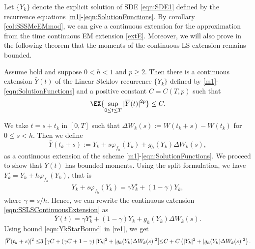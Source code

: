 	
Let $\{Y_k\}$ denote the explicit \SM solution of SDE \eqref{eqn:SDE1} defined by 
the recurrence equations \eqref{m1}-\eqref{eqn:SolutionFunctions}.
By corollary \ref{col:SSSMeEMmod}, we can give a continuous extension for the \SM approximation 
from the time continuous EM extension  \eqref{extE}. 
Moreover, we will also prove in the following theorem that the  moments 
of the continuous LS extension remains bounded.
\begin{corollary}\label{col:ContinuousExtBoundedMoments}
	Assume  hold and suppose  $0<h<1$ and $p\geq 
	2$. Then there is a continuous extension $\overline{Y}(t)$ of the 
	Linear Steklov recurrence $\{Y_k\}$ defined by  
	\eqref{m1}-\eqref{eqn:SolutionFunctions}  and a positive constant $C=C(T,p)$ such 
	that
	\begin{equation*}
		\EX{\sup_{0\leq t \leq T} |\overline{Y}(t)|^{2p} }
		\leq C.
	\end{equation*}
\end{corollary}
	\begin{pf}
		We take $t=s+t_k$ in $ [0,T]$ such that $\Delta W_k(s):= W(t_k+s)- W(t_k)$ for $0\leq s <h$.
		Then we define 
		\begin{equation}\label{eqn:SSLSContinuousExtension}
			\overline{Y}(t_k+s):= Y_k + s \varphi_{f_h}(Y_k) + g_h(Y_k)\Delta W_k(s),
		\end{equation}
		as a continuous extension of the \SM scheme \eqref{m1}-\eqref{eqn:SolutionFunctions}. 
		We proceed to show that $\overline{Y}(t)$ has bounded moments.
		Using the split formulation, we have $Y_k^{\star}= Y_k + h \varphi_{f_h}(Y_k)$,
		that is
		\begin{align*}
			Y_k + s \varphi_{f_h}(Y_k)=\gamma Y_k^{\star} + (1-\gamma)Y_k,
		\end{align*}
		where $\gamma = s/h$. Hence, we can rewrite the continuous extension \eqref{eqn:SSLSContinuousExtension} as
		\begin{equation}\label{re1}
			\overline{Y}(t) =
			\gamma Y^{\star}_k + (1-\gamma) Y_k +g_h(Y_k) \Delta W_k(s). %
		\end{equation}
		Using bound \eqref{eqn:YkStarBound} in \eqref{re1}, we get
		\begin{align}
			|\overline{Y}(t_k+s) |^2 
			\leq \hspace{-0.1cm}
				3\left[
					\gamma C
					+
					\left(
						\gamma C +1 - \gamma
					\right)
					|Y_k|^2
					+
					|g_h(Y_k)\Delta W_k(s)|^2
			\right] \hspace{-0.15cm}\leq\hspace{-0.1cm}
			C
			+
			C
			\left(
				|Y_k|^2 + |g_h(Y_k)\Delta W_k(s)|^2
			\right).
		\notag
		\end{align}
	\end{pf}
